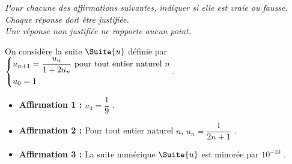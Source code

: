 \emph{Pour chacune des affirmations suivantes, indiquer si elle est vraie ou fausse.\\
Chaque réponse doit être justifiée.\\
Une réponse non justifiée ne rapporte aucun point.}

\medskip

On considère la suite $\Suite{u}$ définie par $\begin{dcases} u_{n+1} = \dfrac{u_n}{1+2u_n} \text{ pour tout entier naturel }n \\ u_0 = 1 \end{dcases}$.

\medskip

\begin{itemize}[label=\textbullet]
	\item \textbf{Affirmation 1 :} \og $u_4=\dfrac{1}{9}$ \fg.
	\item \textbf{Affirmation 2 :} \og Pour tout entier naturel $n$, $u_n = \dfrac{1}{2n+1}$ \fg.
	\item \textbf{Affirmation 3 :} \og La suite numérique $\Suite{u}$ est minorée par $10^{-10}$ \fg.
\end{itemize}